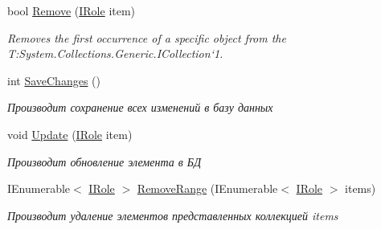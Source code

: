\begin{DoxyCompactItemize}
bool \hyperlink{class_security_1_1_entity_framework_1_1_collections_1_1_role_collection_ad08fece8ec6dcc419706c59bd4963a75}{Remove} (\hyperlink{interface_security_1_1_interfaces_1_1_model_1_1_i_role}{I\+Role} item)
\begin{DoxyCompactList}\small\item\em Removes the first occurrence of a specific object from the T\+:\+System.\+Collections.\+Generic.\+I\+Collection`1. \end{DoxyCompactList}\item 
int \hyperlink{class_security_1_1_entity_framework_1_1_collections_1_1_role_collection_a2e7c92d142847b22b53ddd0738f2b792}{Save\+Changes} ()
\begin{DoxyCompactList}\small\item\em Производит сохранение всех изменений в базу данных \end{DoxyCompactList}\item 
void \hyperlink{class_security_1_1_entity_framework_1_1_collections_1_1_role_collection_aa8cc67b54a4570faa13af3d94a52940a}{Update} (\hyperlink{interface_security_1_1_interfaces_1_1_model_1_1_i_role}{I\+Role} item)
\begin{DoxyCompactList}\small\item\em Производит обновление элемента в БД \end{DoxyCompactList}\item 
I\+Enumerable$<$ \hyperlink{interface_security_1_1_interfaces_1_1_model_1_1_i_role}{I\+Role} $>$ \hyperlink{class_security_1_1_entity_framework_1_1_collections_1_1_role_collection_a423ee7f63c7dce325e7d16af642fc7d6}{Remove\+Range} (I\+Enumerable$<$ \hyperlink{interface_security_1_1_interfaces_1_1_model_1_1_i_role}{I\+Role} $>$ items)
\begin{DoxyCompactList}\small\item\em Производит удаление элементов представленных коллекцией items \end{DoxyCompactList}\end{DoxyCompactItemize}
